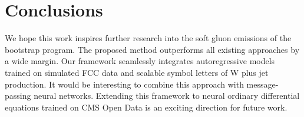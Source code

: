 \section{Conclusions}\label{sec:conclusions}

We hope this work inspires further research into the soft gluon
emissions of the bootstrap program. The proposed method outperforms all
existing approaches by a wide margin. Our framework seamlessly
integrates autoregressive models trained on simulated FCC data and
scalable symbol letters of W plus jet production. It would be
interesting to combine this approach with message-passing neural
networks. Extending this framework to neural ordinary differential
equations trained on CMS Open Data is an exciting direction for future
work.


